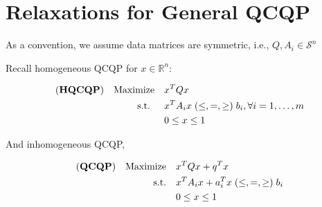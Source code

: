 \documentclass[../main]{subfiles}
\begin{document}
\section{Relaxations for General QCQP}

As a convention, we assume data matrices are symmetric, i.e., \(Q, A_i \in \mathcal{S}^n\)

Recall homogeneous QCQP for \(x \in \mathbb R^n\):

\begin{equation}
  \begin{aligned}
    (\textbf{HQCQP}) \quad \mathrm{Maximize}\quad & x^{T} Q x                                                       \\
    \text { s.t. }  \quad                      & x^{T} A_{i} x\; (\le, =, \ge)  \; b_{i}, \forall i=1, \ldots, m \\
                                               & 0 \le x\le  1
  \end{aligned}
\end{equation}

And inhomogeneous QCQP,

\begin{equation}\label{eq:inhoqcqp}
  \begin{aligned}
    (\textbf{QCQP}) \quad \mathrm{Maximize}\quad & x^TQx +q^T x                                     \\
    \mathrm{s.t.}  \quad                      & x^{T} A_i x  + a_i^Tx   \; (\le, =, \ge)  \; b_i \\
                                              & 0 \le x\le  1
  \end{aligned}
\end{equation}
\end{document}
